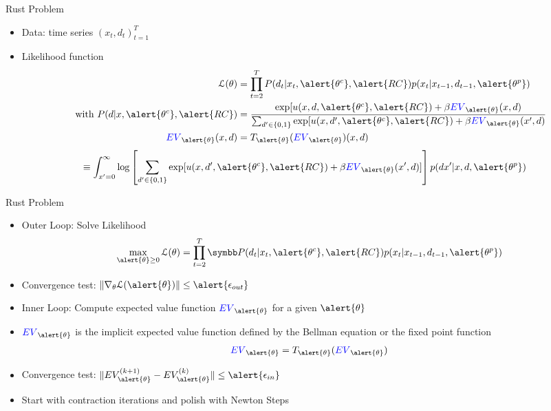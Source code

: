 \documentclass[aspectratio=169,11pt]{beamer}
\begin{document}
\begin{frame}{Rust Problem}
\begin{itemize}
\item Data: time series $(x_t,d_t)_{t=1}^T$
\item Likelihood function
\begin{align*}
\mathcal{L}(\theta) &= \prod_{t=2}^T P(d_t | x_t, \alert{\theta^c}, \alert{RC}) p(x_t | x_{t-1}, d_{t-1},\alert{\theta^p})\\
\mbox{ with }  P(d | x, \alert{\theta^c}, \alert{RC}) &= \frac{\exp[u(x,d,\alert{\theta^c},\alert{RC}) + \beta \textcolor{blue}{EV}_{\alert{\theta}}(x,d)}
{\sum_{d' \in \{0,1\}} \exp[u(x,d',\alert{\theta^c},\alert{RC}) + \beta \textcolor{blue}{EV}_{\alert{\theta}}(x',d)}\\
\textcolor{blue}{EV}_{\alert{\theta}}(x,d) &= T_{\alert{\theta}}(\textcolor{blue}{EV}_{\alert{\theta}})(x,d)\\
\end{align*}
\vspace{-1cm}
\begin{align*}
\equiv \int_{x'=0}^{\infty} &\log \left[ \sum_{d' \in \{0,1\}} \exp[u(x,d',\alert{\theta^c},\alert{RC}) + \beta \textcolor{blue}{EV}_{\alert{\theta}}(x',d)]  \right] p(dx' | x,d,\alert{\theta^p}) 
\end{align*}
\end{itemize}
\end{frame}


\begin{frame}{Rust Problem}
\begin{itemize}
\item Outer Loop: Solve Likelihood
\begin{align*}
\max_{\alert{\theta} \geq 0} \mathcal{L}(\theta) &= \prod_{t=2}^T \Pr(d_t | x_t, \alert{\theta^c}, \alert{RC}) p(x_t | x_{t-1}, d_{t-1},\alert{\theta^p})\\
\end{align*}
\item Convergence test: $\norm{\nabla_{\theta} \mathcal{L}(\alert{\theta})} \leq \alert{\epsilon_{out}}$
\item Inner Loop: Compute expected value function $ \textcolor{blue}{EV}_{\alert{\theta}}$ for a given $\alert{\theta}$
\item $ \textcolor{blue}{EV}_{\alert{\theta}}$ is the implicit expected value function defined by the Bellman equation or the fixed point function
\begin{align*}
 \textcolor{blue}{EV}_{\alert{\theta}} = T_{\alert{\theta}}( \textcolor{blue}{EV}_{\alert{\theta}})
\end{align*}
\item Convergence test: $\norm{ EV^{(k+1)}_{\alert{\theta}} - EV^{(k)}_{\alert{\theta}} } \leq \alert{\epsilon_{in}}$
\item Start with contraction iterations and polish with Newton Steps
\end{itemize}
\end{frame}
\end{document}
